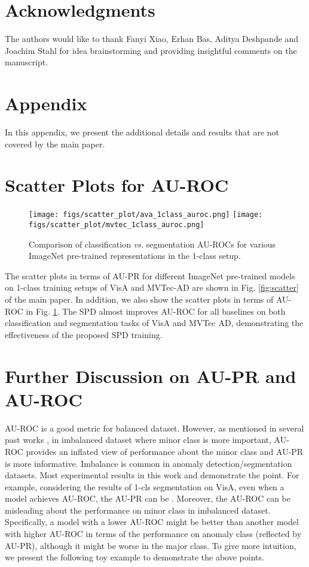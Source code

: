 \documentclass[runningheads]{llncs}
\begin{document}
\section*{Acknowledgments}
The authors would like to thank Fanyi Xiao, Erhan Bas, Aditya Deshpande and Joachim Stahl for idea brainstorming
and providing insightful comments on the manuscript.




\clearpage

\section*{Appendix}
In this appendix, we present the additional details and
results that are not covered by the main paper.

\appendix

\section{Scatter Plots for AU-ROC}
\begin{figure}[!ht]
\centering
\texttt{[image: figs/scatter\_plot/ava\_1class\_auroc.png]}
\texttt{[image: figs/scatter\_plot/mvtec\_1class\_auroc.png]}\\
 \caption{Comparison of classification \textit{vs.} segmentation AU-ROCs for various ImageNet pre-trained representations in the 1-class setup.}
 \label{fig:scatter_auroc}
\end{figure}

The scatter plots in terms of AU-PR for different ImageNet pre-trained models on 1-class training setups of VisA and MVTec-AD are shown in Fig. \ref{fig:scatter} of the main paper. In addition, we also show the scatter plots in terms of AU-ROC in Fig. \ref{fig:scatter_auroc}. The SPD almost improves AU-ROC for all baselines on both classification and segmentation tasks of VisA and MVTec AD, demonstrating the effectiveness of the proposed SPD training.

\section{Further Discussion on AU-PR and AU-ROC}
AU-ROC is a good metric for balanced dataset. However, as mentioned in several past works \cite{cook2020consult,davis2006relationship,saito2015precision}, in imbalanced dataset where minor class is more important, AU-ROC provides an inflated view of performance about the minor class and AU-PR is more informative. Imbalance is common in anomaly detection/segmentation datasets. Most experimental results in this work and \cite{bergmann2021mvtec} demonstrate the point. For example, considering the results of 1-cls segmentation on VisA, even when a model achieves  AU-ROC, the AU-PR can be . Moreover, the AU-ROC can be misleading about the performance on minor class in imbalanced dataset. Specifically, a model with a lower AU-ROC might be better than another model with higher AU-ROC in terms of the performance on anomaly class (reflected by AU-PR), although it might be worse in the major class. To give more intuition, we present the following toy example to demonstrate the above points. 
\end{document}
